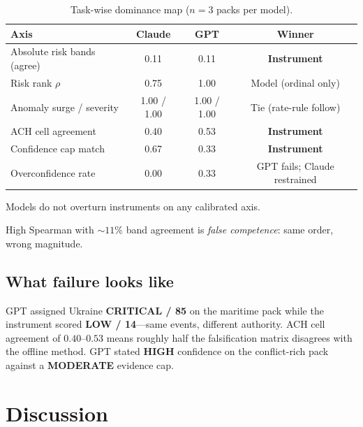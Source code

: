 \documentclass[11pt,a4paper]{article}
\begin{document}
\begin{table}[t]
\centering
\begin{threeparttable}
\caption{Task-wise dominance map ($n{=}3$ packs per model).}
\label{tab:dominance}
\begin{tabular}{@{}lccc@{}}
\toprule
\textbf{Axis} & \textbf{Claude} & \textbf{GPT} & \textbf{Winner} \\
\midrule
Absolute risk bands (agree) & 0.11 & 0.11 & \textbf{Instrument} \\
Risk rank $\rho$ & 0.75 & 1.00 & Model (ordinal only) \\
Anomaly surge / severity & 1.00 / 1.00 & 1.00 / 1.00 & Tie (rate-rule follow) \\
ACH cell agreement & 0.40 & 0.53 & \textbf{Instrument} \\
Confidence cap match & 0.67 & 0.33 & \textbf{Instrument} \\
Overconfidence rate & 0.00 & 0.33 & GPT fails; Claude restrained \\
\bottomrule
\end{tabular}
\begin{tablenotes}[flushleft]
\footnotesize
\item Models do not overturn instruments on any calibrated axis.
\item High Spearman with ${\sim}11\%$ band agreement is \emph{false competence}: same order, wrong magnitude.
\end{tablenotes}
\end{threeparttable}
\end{table}

\subsection{What failure looks like}
GPT assigned Ukraine \textbf{CRITICAL / 85} on the maritime pack while the instrument scored
\textbf{LOW / 14}---same events, different authority.
ACH cell agreement of $0.40$--$0.53$ means roughly half the falsification matrix disagrees with the offline method.
GPT stated \textbf{HIGH} confidence on the conflict-rich pack against a \textbf{MODERATE} evidence cap.

\section{Discussion}
\end{document}
